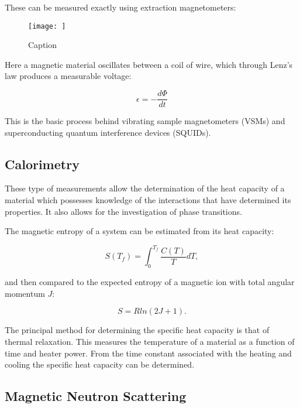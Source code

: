 \noindent These can be measured exactly using extraction magnetometers:

\begin{figure}
    \centering
    \texttt{[image: ]}
    \caption{Caption}
    \label{fig:enter-label}
\end{figure}

\noindent Here a magnetic material oscillates between a coil of wire, which through Lenz's law produces a measurable voltage:

\begin{equation}
    \epsilon = - \frac{d \Phi}{dt}
    \label{LenzLaw}
\end{equation}

\noindent This is the basic process behind vibrating sample magnetometers (VSMs) and superconducting quantum interference devices (SQUIDs).

\subsection{Calorimetry}

These type of measurements allow the determination of the heat capacity of a material which possesses knowledge of the interactions that have determined its properties. It also allows for the investigation of phase transitions.

\noindent The magnetic entropy of a system can be estimated from its heat capacity:

\begin{equation}
    S(T_f) = \int_0^{T_f} \frac{C(T)}{T} dT,
    \label{EstimatedMagneticEntropy}
\end{equation}

\noindent and then compared to the expected entropy of a magnetic ion with total angular momentum $J$:

\begin{equation}
    S = Rln(2J + 1)
    \label{ExactMagneticEntropy}.
\end{equation}

\noindent The principal method for determining the specific heat capacity is that of thermal relaxation. This measures the temperature of a material as a function of time and heater power. From the time constant associated with the heating and cooling the specific heat capacity can be determined.

\subsection{Magnetic Neutron Scattering}

